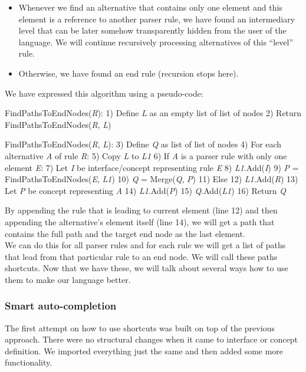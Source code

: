 \begin{itemize}
	\item Whenever we find an alternative that contains only one element and this element is a reference to another parser rule, we have found an intermediary level that can be later somehow transparently hidden from the user of the language. We will continue recursively processing alternatives of this “level” rule. 
	
	\item Otherwise, we have found an end rule (recursion stops here). 
\end{itemize}
	
We have expressed this algorithm using a pseudo-code:

\label{chap:shortcut_algorithm}
\begin{antlr}
FindPathsToEndNodes(\textit{R}):
   1)  Define \textit{L} as an empty list of list of nodes
   2)  Return FindPathsToEndNodes(\textit{R}, \textit{L})

FindPathsToEndNodes(\textit{R}, \textit{L}):
   3)  Define \textit{Q} as list of list of nodes
   4)  For each alternative \textit{A} of rule \textit{R}:
   5)      Copy \textit{L} to \textit{L1}
   6)      If \textit{A} is a parser rule with only one element \textit{E}: 
   7)          Let \textit{I} be interface/concept representing rule \textit{E}
   8)          \textit{L1}.Add(\textit{I})
   9)          \textit{P} = FindPathsToEndNodes(\textit{E}, \textit{L1})
  10)          \textit{Q} = Merge(\textit{Q}, \textit{P})
  11)      Else
  12)          \textit{L1}.Add(\textit{R})
  13)          Let \textit{P} be concept representing \textit{A}
  14)          \textit{L1}.Add(\textit{P})
  15)          \textit{Q}.Add(\textit{L1})
  16)  Return \textit{Q}
\end{antlr}

By appending the rule that is leading to current element (line 12) and then appending the alternative’s element itself (line 14), we will get a path that contains the full path and the target end node as the last element.
\\

We can do this for all parser rules and for each rule we will get a list of paths that lead from that particular rule to an end node. We will call these paths shortcuts. Now that we have these, we will talk about several ways how to use them to make our language better.

\subsubsection{Smart auto-completion}
The first attempt on how to use shortcuts was built on top of the previous approach. There were no structural changes when it came to interface or concept definition. We imported everything just the same and then added some more functionality.

